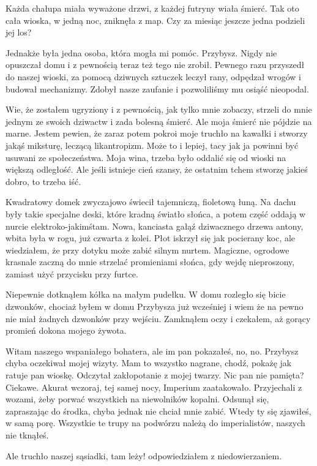 Każda chałupa miała wyważone drzwi, z każdej futryny wiała śmierć.
Tak oto cała wioska, w jedną noc, zniknęła z map.
Czy za miesiąc jeszcze jedna podzieli jej los? 

Jednakże była jedna osoba, która mogła mi pomóc.
Przybysz. Nigdy nie opuszczał domu i z pewnością teraz też tego nie zrobił.
Pewnego razu przyszedł do naszej wioski, za pomocą dziwnych sztuczek leczył rany, odpędzał wrogów i budował mechanizmy.
Zdobył nasze zaufanie i pozwoliliśmy mu osiąść nieopodal.

Wie, że zostałem ugryziony i z pewnością, jak tylko mnie zobaczy, strzeli do mnie jednym ze swoich dziwactw i zada bolesną śmierć.
Ale moja śmierć nie pójdzie na marne. Jestem pewien, że zaraz potem pokroi moje truchło na kawałki i stworzy jakąś miksturę, leczącą likantropizm.
Może to i lepiej, tacy jak ja powinni być usuwani ze społeczeństwa. Moja wina, trzeba było oddalić się od wioski na większą odległość.
Ale jeśli istnieje cień szansy, że ostatnim tchem stworzę jakieś dobro, to trzeba iść.

\divider{}
Kwadratowy domek zwyczajowo świecił tajemniczą, fioletową łuną.
Na dachu były takie specjalne deski, które kradną światło słońca, a potem część oddają w nurcie elektroko-jakimśtam.
Nowa, kanciasta gałąź dziwacznego drzewa antony, wbita była w rogu, już czwarta z kolei.
Płot iskrzył się jak pocierany koc, ale wiedziałem, że przy dotyku może zabić silnym nurtem.
Magiczne, ogrodowe krasnale zaczną do mnie strzelać promieniami słońca, gdy wejdę nieproszony, zamiast użyć przycisku przy furtce.

Niepewnie dotknąłem kółka na małym pudełku. 
W domu rozległo się bicie dzwonków, chociaż byłem w domu Przybysza już wcześniej i wiem że na pewno nie miał żadnych dzwonków przy wejściu.
Zamknąłem oczy i czekałem, aż gorący promień dokona mojego żywota.

\ds{} Witam naszego wspaniałego bohatera, ale im pan pokazałeś, no, no. 
\dm{} Przybysz chyba oczekiwał mojej wizyty. \dm{} Mam to wszystko nagrane, chodź, pokażę jak ratuje pan wioskę.
\dm{} Odczytał zakłopotanie z mojej twarzy.
\dm{} Nic pan nie pamięta? Ciekawe. Akurat wczoraj, tej samej nocy, Imperium zaatakowało.
Przyjechali z wozami, żeby porwać wszystkich na niewolników kopalni.
\dm{} Odsunął się, zapraszając do środka, chyba jednak nie chciał mnie zabić.
\dm{} Wtedy ty się zjawiłeś, w samą porę. Wszystkie te trupy na podwórzu należą do imperialistów, naszych nie tknąłeś. \de{}

\ds{} Ale truchło naszej sąsiadki, tam leży! \dm{} odpowiedziałem z niedowierzaniem. \de{}

